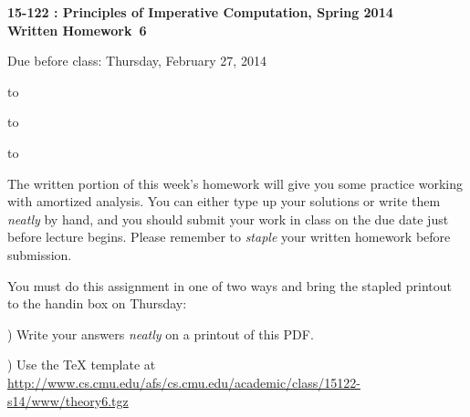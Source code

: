 \documentclass[12pt]{exam}
\newcommand{\hwnumber}{6}
\newcommand{\semester}{Spring 2014}
\begin{document}
\addpoints
\begin{center}
\textbf{\large{15-122 : Principles of Imperative Computation, \semester
\\  \vspace{0.2in} Written Homework~\hwnumber
}}

 \vspace{0.2in}

 \large{Due before class: Thursday, February 27, 2014}
\end{center}

\vspace{0.5in}

\hbox to \textwidth{Name:\enspace\hrulefill}


\vspace{0.2in}

\hbox to \textwidth{Andrew ID:\enspace\hrulefill}

\vspace{0.2in}

\hbox to \textwidth{Recitation:\enspace\hrulefill}


\vspace{0.5in}

\noindent The written portion of this week's homework will give you some
practice working with amortized analysis.
You can either type up your solutions or write them
\textit{neatly} by hand, and you should submit your work in class on the
due date just before lecture begins. Please remember to \textit{staple}
your written homework before submission.
\vspace{0.2in}

\begin{center}
\gradetable[v][questions]
\end{center}

\vspace{0.2in}
\begin{center}
  \Large{You must do this assignment in one of two ways and bring the stapled
         printout to the handin box on Thursday:

) Write your answers \textit{neatly} on a printout of this PDF.

) Use the TeX template at
    \url{http://www.cs.cmu.edu/afs/cs.cmu.edu/academic/class/15122-s14/www/theory6.tgz}
 }
\end{center}
\end{document}
